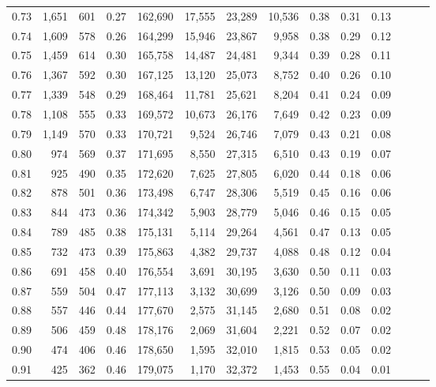 \begin{tabular}{rrrrrrrrrrrrrr}
0.73 &  1,651 &  601 &  0.27 &  162,690 &   17,555 &  23,289 &  10,536 &  0.38 &  0.31 &      0.13 \\
0.74 &  1,609 &  578 &  0.26 &  164,299 &   15,946 &  23,867 &   9,958 &  0.38 &  0.29 &      0.12 \\
0.75 &  1,459 &  614 &  0.30 &  165,758 &   14,487 &  24,481 &   9,344 &  0.39 &  0.28 &      0.11 \\
0.76 &  1,367 &  592 &  0.30 &  167,125 &   13,120 &  25,073 &   8,752 &  0.40 &  0.26 &      0.10 \\
0.77 &  1,339 &  548 &  0.29 &  168,464 &   11,781 &  25,621 &   8,204 &  0.41 &  0.24 &      0.09 \\
0.78 &  1,108 &  555 &  0.33 &  169,572 &   10,673 &  26,176 &   7,649 &  0.42 &  0.23 &      0.09 \\
0.79 &  1,149 &  570 &  0.33 &  170,721 &    9,524 &  26,746 &   7,079 &  0.43 &  0.21 &      0.08 \\
0.80 &    974 &  569 &  0.37 &  171,695 &    8,550 &  27,315 &   6,510 &  0.43 &  0.19 &      0.07 \\
0.81 &    925 &  490 &  0.35 &  172,620 &    7,625 &  27,805 &   6,020 &  0.44 &  0.18 &      0.06 \\
0.82 &    878 &  501 &  0.36 &  173,498 &    6,747 &  28,306 &   5,519 &  0.45 &  0.16 &      0.06 \\
0.83 &    844 &  473 &  0.36 &  174,342 &    5,903 &  28,779 &   5,046 &  0.46 &  0.15 &      0.05 \\
0.84 &    789 &  485 &  0.38 &  175,131 &    5,114 &  29,264 &   4,561 &  0.47 &  0.13 &      0.05 \\
0.85 &    732 &  473 &  0.39 &  175,863 &    4,382 &  29,737 &   4,088 &  0.48 &  0.12 &      0.04 \\
0.86 &    691 &  458 &  0.40 &  176,554 &    3,691 &  30,195 &   3,630 &  0.50 &  0.11 &      0.03 \\
0.87 &    559 &  504 &  0.47 &  177,113 &    3,132 &  30,699 &   3,126 &  0.50 &  0.09 &      0.03 \\
0.88 &    557 &  446 &  0.44 &  177,670 &    2,575 &  31,145 &   2,680 &  0.51 &  0.08 &      0.02 \\
0.89 &    506 &  459 &  0.48 &  178,176 &    2,069 &  31,604 &   2,221 &  0.52 &  0.07 &      0.02 \\
0.90 &    474 &  406 &  0.46 &  178,650 &    1,595 &  32,010 &   1,815 &  0.53 &  0.05 &      0.02 \\
0.91 &    425 &  362 &  0.46 &  179,075 &    1,170 &  32,372 &   1,453 &  0.55 &  0.04 &      0.01 \\

\end{tabular}
